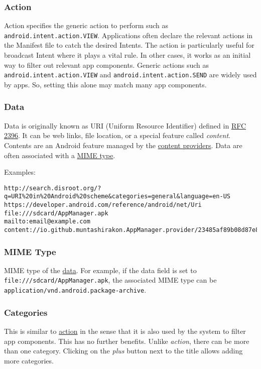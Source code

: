 \subsubsection{Action}\label{subsubsec:action} %
Action specifies the generic action to perform such as \texttt{android.intent.action.VIEW}. Applications often declare
the relevant actions in the Manifest file to catch the desired Intents. The action is particularly useful for broadcast
Intent where it plays a vital rule. In other cases, it works as an initial way to filter out relevant app components.
Generic actions such as \texttt{android.intent.action.VIEW} and \texttt{android.intent.action.SEND} are widely used by
apps. So, setting this alone may match many app components.

\subsubsection{Data}\label{subsubsec:data} %
Data is originally known as URI (Uniform Resource Identifier) defined in
\href{http://www.faqs.org/rfcs/rfc2396.html}{RFC 2396}. It can be web links, file location, or a special feature called
\textit{content}. Contents are an Android feature managed by the \hyperref[appdetails:providers]{content providers}.
Data are often associated with a \hyperref[subsubsec:mime-type]{MIME type}.

Examples:
\begin{Verbatim}
http://search.disroot.org/?q=URI%20in%20Android%20scheme&categories=general&language=en-US
https://developer.android.com/reference/android/net/Uri
file:///sdcard/AppManager.apk
mailto:email@example.com
content://io.github.muntashirakon.AppManager.provider/23485af89b08d87e898a90c7e/AppManager.apk
\end{Verbatim}

\subsubsection{MIME Type}\label{subsubsec:mime-type} %
MIME type of the \hyperref[subsubsec:data]{data}. For example, if the data field is set to
\texttt{file:///sdcard/AppManager.apk}, the associated MIME type can be \texttt{application/vnd.android.package-archive}.

\subsubsection{Categories} %
This is similar to \hyperref[subsubsec:action]{action} in the sense that it is also used by the system to filter app
components. This has no further benefits. Unlike \textit{action}, there can be more than one category. Clicking on the
\textit{plus} button next to the title allows adding more categories.

